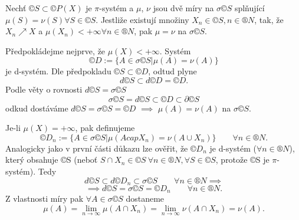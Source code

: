 \documentclass[12pt]{article}					%
\begin{document}

\begin{veta}
	Nechť $©S \subset ©P(X)$ je $\pi$-systém a $\mu$, $\nu$ jsou dvě míry na $\sigma ©S$ splňující $\mu(S) = \nu(S) \forall S \in ©S$. Jestliže existují množiny $X_n \in ©S, n \in ®N$, tak, že $X_n \nearrow X$ a $\mu(X_n) < +∞ \forall n \in ®N$, pak $\mu = \nu$ na $\sigma ©S$.

	\begin{dukazin}
		Předpokládejme nejprve, že $\mu(X) < +∞$. Systém
		$$ ©D := \{A \in \sigma ©S | \mu(A) = \nu(A)\} $$
		je d-systém. Dle předpokladu $©S \subset ©D$, odtud plyne
		$$ d ©S \subset d ©D = ©D. $$
		Podle věty o rovnosti $d©S = \sigma ©S$
		$$ \sigma ©S = d©S \subset ©D \subset \partial ©S $$
		odkud dostáváme $d©S = \sigma ©S = ©D$ $\implies$ $\mu(A) = \nu(A)$ na $\sigma ©S$.

		Je-li $\mu(X) = +∞$, pak definujeme
		$$ ©D_n := \{A \in \sigma ©S | \mu(A cap X_n) = \nu(A \cup X_n)\} \qquad \forall n \in ®N. $$
		Analogicky jako v první části důkazu lze ověřit, že $©D_n$ je d-systém ($\forall n \in ®N$), který obsahuje ©S (neboť $S \cap X_n \in ©S\ \forall n \in ®N, \forall S \in ©S$, protože ©S je $\pi$-systém). Tedy
		$$ d©S \subset d©D_n \subset \sigma ©S \qquad \forall n \in ®N \implies $$
		$$ \implies d©S = \sigma ©S = ©D_n \qquad \forall n \in ®N. $$
		Z vlastnosti míry pak $\forall A \in \sigma ©S$ dostaneme
		$$ \mu(A) = \lim_{n \rightarrow ∞} \mu(A \cap X_n) = \lim_{n \rightarrow ∞} \nu(A \cap X_n) = \nu(A). $$
	\end{dukazin}
\end{veta}
\end{document}
